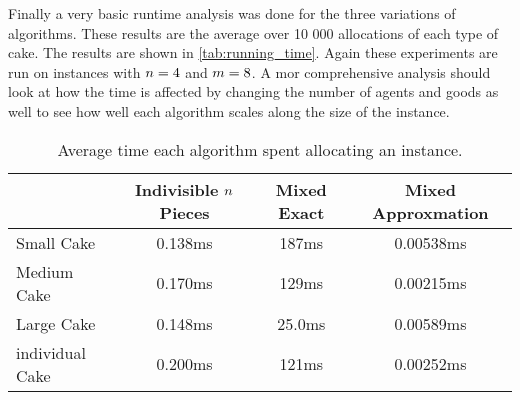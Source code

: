 Finally a very basic runtime analysis was done for the three variations of algorithms. These results are the average over 10 000 allocations of each type of cake. The results are shown in \autoref{tab:running_time}. Again these experiments are run on instances with $n=4$ and $m=8$. A mor comprehensive analysis should look at how the time is affected by changing the number of agents and goods as well to see how well each algorithm scales along the size of the instance.

\begin{table}[h]
    \centering
    \caption{Average time each algorithm spent allocating an instance.}
    \label{tab:running_time}
    \begin{tabular}{|l|ccc|}
        \hline
                        & Indivisible $n$ Pieces & Mixed Exact & Mixed Approxmation \\
        \hline
        Small Cake      & 0.138ms                          & 187ms       & 0.00538ms          \\
        Medium Cake     & 0.170ms                          & 129ms       & 0.00215ms          \\
        Large Cake      & 0.148ms                          & 25.0ms      & 0.00589ms          \\
        individual Cake & 0.200ms                          & 121ms       & 0.00252ms          \\
        \hline
    \end{tabular}
\end{table}






